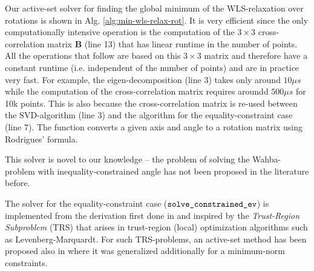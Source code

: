 Our active-set solver for finding the global minimum of the WLS-relaxation over rotations is shown in Alg. \ref{alg:min-wls-relax-rot}. It is very efficient since the only computationally intensive operation is the computation of the $3 \times 3$ cross-correlation matrix $\mathbf{B}$ (line 13) that has linear runtime in the number of points. All the operations that follow are based on this $3 \times 3$ matrix and therefore have a constant runtime (i.e. independent of the number of points) and are in practice very fast. For example, the eigen-decomposition (line 3) takes only around $10 \mu s$ while the computation of the cross-correlation matrix requires aroundd $500 \mu s$ for 10k points. This is also because the cross-correlation matrix is re-used between the SVD-algorithm (line 3) and the algorithm for the equality-constraint case (line 7). The function  converts a given axis and angle to a rotation matrix using Rodrigues' formula.

This solver is novel to our knowledge -- the problem of solving the Wahba-problem with inequality-constrained angle has not been proposed in the literature before.

The solver for the equality-constraint case ($\texttt{solve\_constrained\_ev}$) is implemented from the derivation first done in \cite{10.1007/978-3-642-75536-1_57} and inspired by the \textit{Trust-Region Subproblem} (TRS) that arises in trust-region (local) optimization algorithms \cite{Adachi2017SolvingTT} such as Levenberg-Marquardt. For such TRS-problems, an active-set method has been proposed also in \cite{Rontsis2022} where it was generalized additionally for a minimum-norm constraints.

